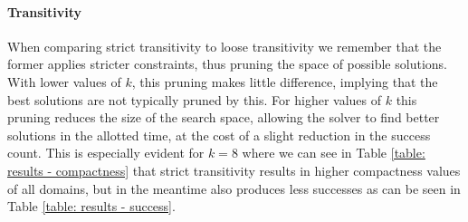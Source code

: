 \paragraph{Transitivity}
When comparing strict transitivity to loose transitivity we remember that the former applies stricter constraints, thus pruning the space of possible solutions. With lower values of $k$, this pruning makes little difference, implying that the best solutions are not typically pruned by this. For higher values of $k$ this pruning reduces the size of the search space, allowing the solver to find better solutions in the allotted time, at the cost of a slight reduction in the success count. This is especially evident for $k=8$ where we can see in Table \ref{table: results - compactness} that strict transitivity results in higher compactness values of all domains, but in the meantime also produces less successes as can be seen in Table \ref{table: results - success}. 